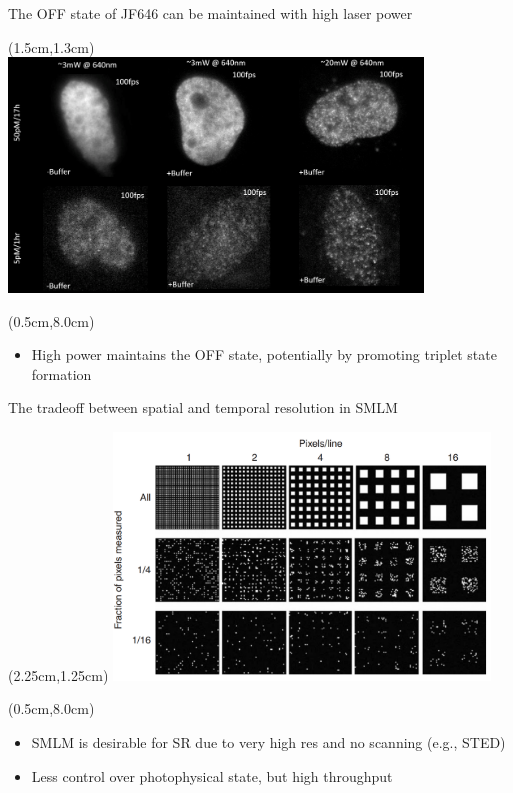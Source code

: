 \documentclass{beamer}					%
\begin{document}
\begin{frame}{The OFF state of JF646 can be maintained with high laser power}
\begin{textblock*}{11cm}(1.5cm,1.3cm)
\includegraphics[width=11cm]{Laser.png}
\end{textblock*}
\begin{textblock*}{\textwidth}(0.5cm,8.0cm)
\begin{itemize}
\item High power maintains the OFF state, potentially by promoting triplet state formation
\end{itemize}
\end{textblock*}
\end{frame}

\begin{frame}{The tradeoff between spatial and temporal resolution in SMLM}
\begin{textblock*}{10cm}(2.25cm,1.25cm)
\includegraphics[width=10cm]{Shroff.png}
\end{textblock*}
\begin{textblock*}{\textwidth}(0.5cm,8.0cm)
\begin{itemize}
\item SMLM is desirable for SR due to very high res and no scanning (e.g., STED)
\item Less control over photophysical state, but high throughput
\end{itemize}
\end{textblock*}
\end{frame}
\end{document}
